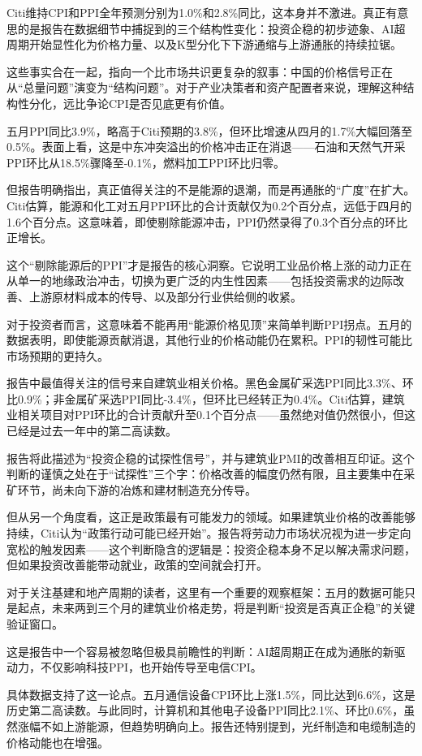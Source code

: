 \documentclass[11pt]{ctexart}
\begin{document}
Citi维持CPI和PPI全年预测分别为1.0\%和2.8\%同比，这本身并不激进。真正有意思的是报告在数据细节中捕捉到的三个结构性变化：投资企稳的初步迹象、AI超周期开始显性化为价格力量、以及K型分化下下游通缩与上游通胀的持续拉锯。

这些事实合在一起，指向一个比市场共识更复杂的叙事：中国的价格信号正在从“总量问题”演变为“结构问题”。对于产业决策者和资产配置者来说，理解这种结构性分化，远比争论CPI是否见底更有价值。

五月PPI同比3.9\%，略高于Citi预期的3.8\%，但环比增速从四月的1.7\%大幅回落至0.5\%。表面上看，这是中东冲突溢出的价格冲击正在消退——石油和天然气开采PPI环比从18.5\%骤降至-0.1\%，燃料加工PPI环比归零。

但报告明确指出，真正值得关注的不是能源的退潮，而是再通胀的“广度”在扩大。Citi估算，能源和化工对五月PPI环比的合计贡献仅为0.2个百分点，远低于四月的1.6个百分点。这意味着，即使剔除能源冲击，PPI仍然录得了0.3个百分点的环比正增长。

这个“剔除能源后的PPI”才是报告的核心洞察。它说明工业品价格上涨的动力正在从单一的地缘政治冲击，切换为更广泛的内生性因素——包括投资需求的边际改善、上游原材料成本的传导、以及部分行业供给侧的收紧。

对于投资者而言，这意味着不能再用“能源价格见顶”来简单判断PPI拐点。五月的数据表明，即使能源贡献消退，其他行业的价格动能仍在累积。PPI的韧性可能比市场预期的更持久。

报告中最值得关注的信号来自建筑业相关价格。黑色金属矿采选PPI同比3.3\%、环比0.9\%；非金属矿采选PPI同比-3.4\%，但环比已经转正为0.4\%。Citi估算，建筑业相关项目对PPI环比的合计贡献升至0.1个百分点——虽然绝对值仍然很小，但这已经是过去一年中的第二高读数。

报告将此描述为“投资企稳的试探性信号”，并与建筑业PMI的改善相互印证。这个判断的谨慎之处在于“试探性”三个字：价格改善的幅度仍然有限，且主要集中在采矿环节，尚未向下游的冶炼和建材制造充分传导。

但从另一个角度看，这正是政策最有可能发力的领域。如果建筑业价格的改善能够持续，Citi认为“政策行动可能已经开始”。报告将劳动力市场状况视为进一步定向宽松的触发因素——这个判断隐含的逻辑是：投资企稳本身不足以解决需求问题，但如果投资改善能带动就业，政策的空间就会打开。

对于关注基建和地产周期的读者，这里有一个重要的观察框架：五月的数据可能只是起点，未来两到三个月的建筑业价格走势，将是判断“投资是否真正企稳”的关键验证窗口。

这是报告中一个容易被忽略但极具前瞻性的判断：AI超周期正在成为通胀的新驱动力，不仅影响科技PPI，也开始传导至电信CPI。

具体数据支持了这一论点。五月通信设备CPI环比上涨1.5\%，同比达到6.6\%，这是历史第二高读数。与此同时，计算机和其他电子设备PPI同比2.1\%、环比0.6\%，虽然涨幅不如上游能源，但趋势明确向上。报告还特别提到，光纤制造和电缆制造的价格动能也在增强。
\end{document}
